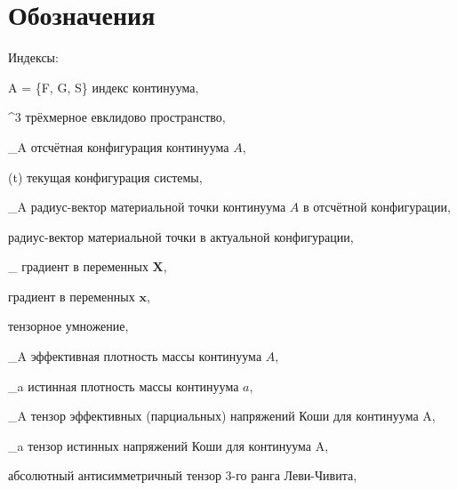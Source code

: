 \section*{Обозначения}
\setcounter{subsection}{0}
	
	Индексы:
\begin{where}
	\item [A = \{F, G, S\}] индекс континуума,
\end{where}

\begin{where}
	\item [\mathbb{E}^3] трёхмерное евклидово пространство,
	\item [\kappa_A] отсчётная конфигурация континуума $A$,
	\item [\chi(t)] текущая конфигурация системы,
	\item [\boldsymbol{X}_A] радиус-вектор материальной точки континуума $A$ в отсчётной конфигурации,
	\item [\boldsymbol{x}] радиус-вектор материальной точки в актуальной конфигурации,
	\item [\nabla_{\kappa}] градиент в переменных $\boldsymbol{X}$,
	\item [\nabla] градиент в переменных $\boldsymbol{x}$,
	\item [\otimes] тензорное умножение,
	\item [\rho_A] эффективная плотность массы континуума $A$,
	\item [\rho_a] истинная плотность массы континуума $a$,
	\item [\boldsymbol{\sigma}_A] тензор эффективных (парциальных) напряжений Коши для континуума A,
	\item [\boldsymbol{\sigma}_a] тензор истинных напряжений Коши для континуума A,
	\item [\boldsymbol{\varepsilon}] абсолютный антисимметричный тензор 3-го ранга Леви-Чивита,
\end{where}
